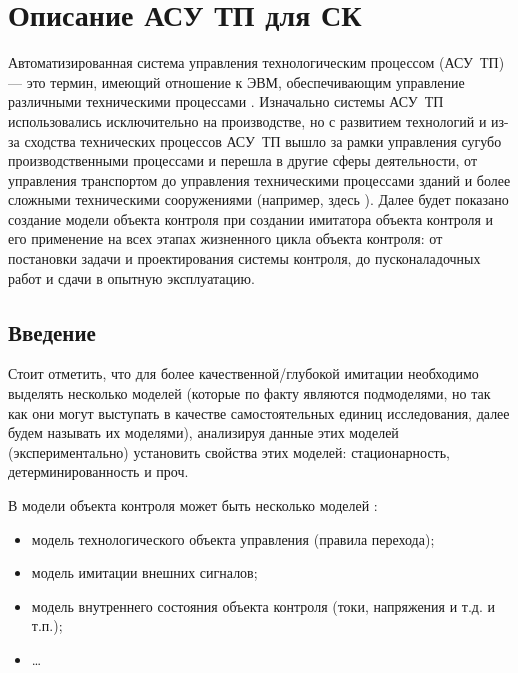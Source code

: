 \chapter{Описание АСУ ТП для СК}\label{ch:chn}


Автоматизированная система управления технологическим процессом (АСУ~ТП) --- это термин,
имеющий отношение к ЭВМ, обеспечивающим управление различными техническими процессами \cite{journal:iter_research_guriev_2016}.
Изначально системы АСУ~ТП использовались исключительно на производстве, но с развитием технологий
и из-за сходства технических процессов АСУ~ТП вышло за рамки управления сугубо производственными процессами
и перешла в другие сферы деятельности, от управления транспортом %
до управления техническими процессами зданий \cite{journal:vechisl_tech:2013:Golushko}
и более сложными техническими сооружениями (например, здесь \cite{journal:vechisl_tech:2004_okolnischnikov}).
%
Далее будет показано создание  модели объекта контроля
при создании имитатора объекта контроля и его применение на всех этапах жизненного цикла
объекта контроля: от постановки задачи и проектирования системы контроля, до пусконаладочных работ
и сдачи в опытную эксплуатацию.

\section*{Введение}


Стоит отметить, что для более качественной/глубокой имитации необходимо выделять несколько моделей
(которые по факту являются подмоделями, но так как они могут выступать в качестве самостоятельных единиц исследования,
далее будем называть их моделями),
анализируя данные этих моделей (экспериментально) установить свойства этих моделей:
стационарность, детерминированность и проч.

В модели объекта контроля может быть несколько моделей \cite{journal:vechisl_tech:2004_okolnischnikov}:
\begin{itemize}
    \item модель технологического объекта управления (правила перехода);
    \item модель имитации внешних сигналов;
    \item модель внутреннего состояния объекта контроля (токи, напряжения и т.д. и т.п.);
    \item \ldots
\end{itemize}

